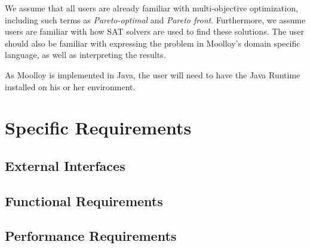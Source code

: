 \documentclass[11pt]{article}
\theoremstyle{definition}
\begin{document}
We assume that all users are already familiar with multi-objective
optimization, including such terms as \textit{Pareto-optimal} and
\textit{Pareto front}. Furthermore, we assume users are familiar with
how SAT solvers are used to find these solutions. The user should also
be familiar with expressing the problem in Moolloy's domain specific
language, as well as interpreting the results.



As Moolloy is implemented in Java, the user will need to have the Java
Runtime installed on his or her environment.

\section{Specific Requirements}

\subsection{External Interfaces}

\subsection{Functional Requirements}

\subsection{Performance Requirements}
\end{document}
